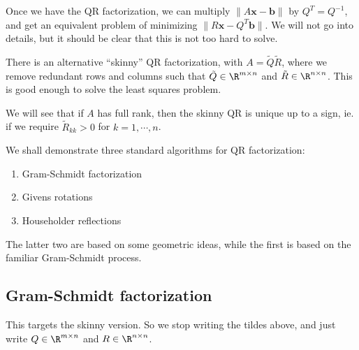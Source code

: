 \documentclass[a4paper]{article}
\begin{document}
Once we have the QR factorization, we can multiply $\|A\mathbf{x} - \mathbf{b}\|$ by $Q^T = Q^{-1}$, and get an equivalent problem of minimizing $\|R \mathbf{x} - Q^T \mathbf{b}\|$. We will not go into details, but it should be clear that this is not too hard to solve.

There is an alternative ``skinny'' QR factorization, with $A = \tilde{Q} \tilde{R}$, where we remove redundant rows and columns such that $\tilde{Q} \in \R^{m \times n}$ and $\tilde{R} \in \R^{n \times n}$. %
This is good enough to solve the least squares problem.

We will see that if $A$ has full rank, then the skinny QR is unique up to a sign, ie. if we require $\tilde{R}_{kk} > 0$ for $k = 1, \cdots, n$.

We shall demonstrate three standard algorithms for QR factorization:
\begin{enumerate}
  \item Gram-Schmidt factorization
  \item Givens rotations
  \item Householder reflections
\end{enumerate}
The latter two are based on some geometric ideas, while the first is based on the familiar Gram-Schmidt process.

\subsection{Gram-Schmidt factorization}
This targets the skinny version. So we stop writing the tildes above, and just write $Q \in \R^{m \times n}$ and $R \in \R^{n \times n}$.
\end{document}
